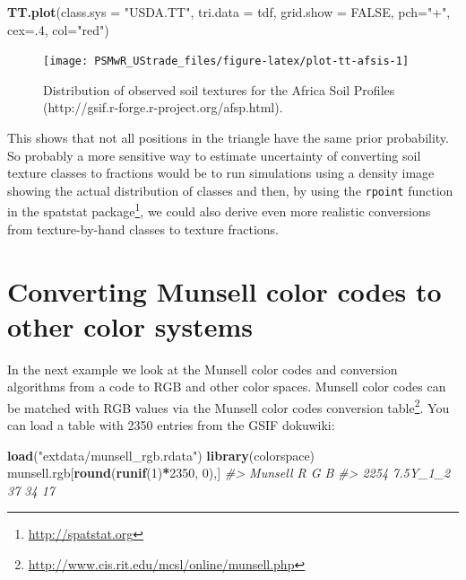 \documentclass[graybox,natbib,nospthms,UStrade]{svmono}
\newenvironment{Shaded}{\begin{snugshade}}{\end{snugshade}}
\newcommand{\CommentTok}[1]{\textcolor[rgb]{0.37,0.37,0.37}{\textit{#1}}}
\newcommand{\DataTypeTok}[1]{\textcolor[rgb]{0.27,0.27,0.27}{#1}}
\newcommand{\DecValTok}[1]{\textcolor[rgb]{0.06,0.06,0.06}{#1}}
\newcommand{\KeywordTok}[1]{\textcolor[rgb]{0.27,0.27,0.27}{\textbf{#1}}}
\newcommand{\NormalTok}[1]{#1}
\newcommand{\OperatorTok}[1]{\textcolor[rgb]{0.43,0.43,0.43}{\textbf{#1}}}
\newcommand{\OtherTok}[1]{\textcolor[rgb]{0.37,0.37,0.37}{#1}}
\newcommand{\StringTok}[1]{\textcolor[rgb]{0.5,0.5,0.5}{#1}}
\renewcommand{\href}[2]{#2 (\url{#1})}
\renewcommand{\href}[2]{#2\footnote{\url{#1}}}
\begin{document}
\begin{Shaded}
\begin{Highlighting}[]
\KeywordTok{TT.plot}\NormalTok{(}\DataTypeTok{class.sys =} \StringTok{"USDA.TT"}\NormalTok{, }\DataTypeTok{tri.data =}\NormalTok{ tdf, }
        \DataTypeTok{grid.show =} \OtherTok{FALSE}\NormalTok{, }\DataTypeTok{pch=}\StringTok{"+"}\NormalTok{, }\DataTypeTok{cex=}\NormalTok{.}\DecValTok{4}\NormalTok{, }\DataTypeTok{col=}\StringTok{"red"}\NormalTok{)}
\end{Highlighting}
\end{Shaded}

\begin{figure}[H]

{\centering \texttt{[image: PSMwR\_UStrade\_files/figure-latex/plot-tt-afsis-1]} 

}

\caption{Distribution of observed soil textures for the Africa Soil Profiles (http://gsif.r-forge.r-project.org/afsp.html).}\label{fig:plot-tt-afsis}
\end{figure}

This shows that not all positions in the triangle have the same prior probability. So probably a more sensitive way to estimate uncertainty of converting soil texture classes to fractions would be to run simulations using a density image showing the actual distribution of classes and then, by using the \texttt{rpoint} function in the \href{http://spatstat.org}{spatstat package}, we could also derive even more realistic conversions from texture-by-hand classes to texture fractions.

\hypertarget{converting-munsell-color-codes-to-other-color-systems}{%
\section{Converting Munsell color codes to other color systems}\label{converting-munsell-color-codes-to-other-color-systems}}

In the next example we look at the Munsell color codes and conversion algorithms from a code to RGB and other color spaces. Munsell color codes can be matched with RGB values via the \href{http://www.cis.rit.edu/mcsl/online/munsell.php}{Munsell color codes conversion table}. You can load a table with 2350 entries from the GSIF dokuwiki:

\begin{Shaded}
\begin{Highlighting}[]
\KeywordTok{load}\NormalTok{(}\StringTok{"extdata/munsell_rgb.rdata"}\NormalTok{)}
\KeywordTok{library}\NormalTok{(colorspace)}
\NormalTok{munsell.rgb[}\KeywordTok{round}\NormalTok{(}\KeywordTok{runif}\NormalTok{(}\DecValTok{1}\NormalTok{)}\OperatorTok{*}\DecValTok{2350}\NormalTok{, }\DecValTok{0}\NormalTok{),]}
\CommentTok{#>       Munsell  R  G  B}
\CommentTok{#> 2254 7.5Y_1_2 37 34 17}
\end{Highlighting}
\end{Shaded}
\end{document}
